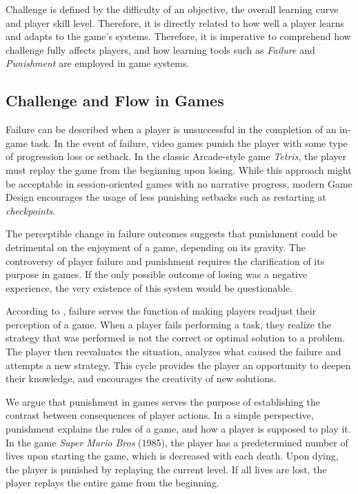 \documentclass[cic,tc,english]{iiufrgs}
\begin{document}
Challenge is defined by the difficulty of an objective, the overall learning curve and player skill level. Therefore, it is directly related to how well a player learns and adapts to the game's systems. Therefore, it is imperative to comprehend how challenge fully affects players, and how learning tools such as \emph{Failure} and \emph{Punishment} are employed in game systems.

\subsection{Challenge and Flow in Games}
\label{section-challenge-flow}

Failure can be described when a player is unsuccessful in the completion of an in-game task. In the event of failure, video games punish the player with some type of progression loss or setback. In the classic Arcade-style game \emph{Tetris}, the player must replay the game from the beginning upon losing. While this approach might be acceptable in session-oriented games with no narrative progress, modern Game Design encourages the usage of less punishing setbacks such as restarting at \emph{checkpoints}. 

The perceptible change in failure outcomes suggests that punishment could be detrimental on the enjoyment of a game, depending on its gravity. The controversy of player failure and punishment requires the clarification of its purpose in games. If the only possible outcome of losing was a negative experience, the very existence of this system would be questionable.

According to \cite{ARTICLE_FearOfFailure}, failure serves the function of making players readjust their perception of a game. When a player fails performing a task, they realize the strategy that was performed is not the correct or optimal solution to a problem. The player then reevaluates the situation, analyzes what caused the failure and attempts a new strategy. This cycle provides the player an opportunity to deepen their knowledge, and encourages the creativity of new solutions.

We argue that punishment in games serves the purpose of establishing the contrast between consequences of player actions. In a simple perspective, punishment explains the rules of a game, and how a player is supposed to play it. In the game \emph{Super Mario Bros} (1985), the player has a predetermined number of lives upon starting the game, which is decreased with each death. Upon dying, the player is punished by replaying the current level. If all lives are lost, the player replays the entire game from the beginning.
\end{document}
